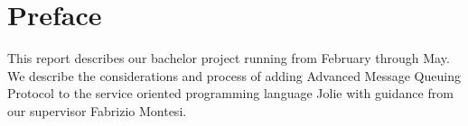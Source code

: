 \section{Preface}
This report describes our bachelor project running from February through May. We describe the considerations and process of adding Advanced Message Queuing Protocol to the service oriented programming language Jolie with guidance from our supervisor Fabrizio Montesi.
\newpage